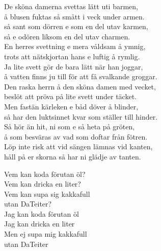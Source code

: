 \documentclass[12pt]{article}
\begin{document}
\noindent
\begin{minipage}{0.55\textwidth}

	\noindent
	De sköna damerna svettas lätt uti barmen,\\
	å blusen fuktas så smått i veck under armen.\\
	så sant som dörren e som en del utav karmen,\\
	så e odören liksom en del utav charmen.\\

	\noindent
	En herres svettning e mera våldsam å ymnig,\\
	trots att nätskjortan hans e luftig å rymlig.\\
	Ja lite svett gör de bara lätt när han joggar,\\
	å vatten finns ju till för att få svalkande groggar.\\

	\noindent
	Den raska herrn å den sköna damen med vecket,\\
	beslöt att pröva på lite svett under täcket.\\
	Men fastän kärleken e båd döver å blinder,\\
	så har den luktsinnet kvar som ställer till hinder.\\

	\noindent
	Så hör än hit, ni som e så heta på gröten,\\
	å som besväras av vad som doftar från fötren.\\
	Löp inte risk att vid sängen lämnas vid kanten,\\
	håll på er skorna så har ni glädje av tanten.\\
\end{minipage}%
\hspace{0.05\textwidth}
\noindent
\begin{minipage}{.4\textwidth}
	\noindent
	Vem kan koda förutan öl?\\
	Vem kan dricka en liter?\\
	Vem kan supa sig kakkafull\\
	utan DaTeiter?\\
	
	\noindent
	Jag kan koda förutan öl\\
	Jag kan dricka en liter\\
	Men ej supa mig kakkafull\\
	utan DaTeiter\\

	\vspace{5.1cm}
\end{minipage}
\end{document}
